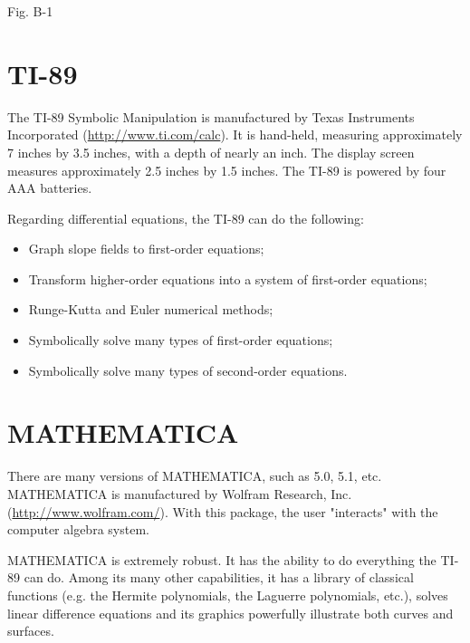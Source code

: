 \documentclass[10pt]{article}
\begin{document}
Fig. B-1

\section*{TI-89}
The TI-89 Symbolic Manipulation is manufactured by Texas Instruments Incorporated (\href{http://www.ti.com/calc}{http://www.ti.com/calc}). It is hand-held, measuring approximately 7 inches by 3.5 inches, with a depth of nearly an inch. The display screen measures approximately 2.5 inches by 1.5 inches. The TI-89 is powered by four AAA batteries.

Regarding differential equations, the TI-89 can do the following:

\begin{itemize}
  \item Graph slope fields to first-order equations;
  \item Transform higher-order equations into a system of first-order equations;
  \item Runge-Kutta and Euler numerical methods;
  \item Symbolically solve many types of first-order equations;
  \item Symbolically solve many types of second-order equations.
\end{itemize}

\section*{MATHEMATICA}
There are many versions of MATHEMATICA, such as 5.0, 5.1, etc. MATHEMATICA is manufactured by Wolfram Research, Inc. (\href{http://www.wolfram.com/}{http://www.wolfram.com/}). With this package, the user "interacts" with the computer algebra system.

MATHEMATICA is extremely robust. It has the ability to do everything the TI-89 can do. Among its many other capabilities, it has a library of classical functions (e.g. the Hermite polynomials, the Laguerre polynomials, etc.), solves linear difference equations and its graphics powerfully illustrate both curves and surfaces.
\end{document}
